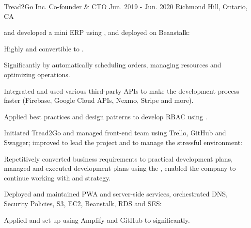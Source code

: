 \begin{cventries}
  \cventry
    {Tread2Go Inc.} %
    {Co-founder \& CTO} %
    {Jun. 2019 - Jun. 2020} %
    {Richmond Hill, Ontario, CA} %
    {
      \begin{cvitems} %
        \item { and developed a mini ERP  using ,  and deployed on  Beanstalk:}
          \begin{cvsubitems}
            \item {Highly  and convertible to .}
            \item {Significantly  by automatically scheduling orders, managing resources and optimizing operations.}
            \item {Integrated and used various third-party APIs to make the development process faster  (Firebase, Google Cloud APIs, Nexmo, Stripe and more).}
            \item {Applied best practices and design patterns to develop RBAC using .}
          \end{cvsubitems}
        \item {Initiated Tread2Go  and managed  front-end team using Trello, GitHub and Swagger; improved  to lead the project and  to manage the stressful environment:}
          \begin{cvsubitems}
            \item {Repetitively converted business requirements to practical development plans, managed and executed development plans using the , enabled the company to continue working with  and  strategy.}
          \end{cvsubitems}
        \item {Deployed and maintained PWA and server-side services, orchestrated DNS, Security Policies, S3, EC2, Beanstalk, RDS and SES:}
          \begin{cvsubitems}
            \item {Applied and set up  using Amplify and GitHub to  significantly.}
          \end{cvsubitems}
      \end{cvitems}
    }


\end{cventries}
